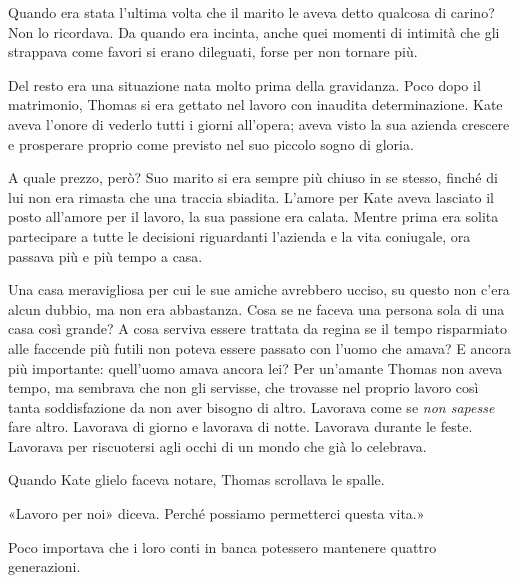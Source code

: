 \documentclass[a4paper,oneside,11pt]{memoir}
\begin{document}
Quando era stata l'ultima volta che il marito le aveva detto qualcosa di carino? Non lo ricordava. Da quando era
incinta, anche quei momenti di intimità che gli strappava come favori si erano dileguati, forse per non tornare più.

Del resto era una situazione nata molto prima della gravidanza. Poco dopo il matrimonio, Thomas si era gettato nel
lavoro con inaudita determinazione. Kate aveva l'onore di vederlo tutti i giorni all'opera; aveva visto la sua azienda
crescere e prosperare proprio come previsto nel suo piccolo sogno di gloria.

A quale prezzo, però? Suo marito si era sempre più chiuso in se stesso, finché di lui non era rimasta che una traccia
sbiadita. L'amore per Kate aveva lasciato il posto all'amore per il lavoro, la sua passione era calata. Mentre prima era
solita partecipare a tutte le decisioni riguardanti l'azienda e la vita coniugale, ora passava più e più tempo a casa.

Una casa meravigliosa per cui le sue amiche avrebbero ucciso, su questo non c'era alcun dubbio, ma non era abbastanza.
Cosa se ne faceva una persona sola di una casa così grande? A cosa serviva essere trattata da regina se il tempo
risparmiato alle faccende più futili non poteva essere passato con l'uomo che amava? E ancora più importante: quell'uomo
amava ancora lei? Per un'amante Thomas non aveva tempo, ma sembrava che non gli servisse, che trovasse nel proprio
lavoro così tanta soddisfazione da non aver bisogno di altro. Lavorava come se \emph{non sapesse} fare altro. Lavorava
di giorno e lavorava di notte. Lavorava durante le feste. Lavorava per riscuotersi agli occhi di un mondo che già lo
celebrava.

Quando Kate glielo faceva notare, Thomas scrollava le spalle.

«Lavoro per noi» diceva. Perché possiamo permetterci questa vita.»

Poco importava che i loro conti in banca potessero mantenere quattro generazioni.
\end{document}
